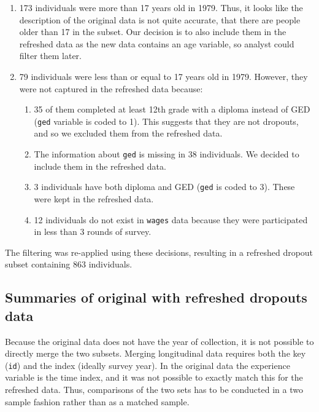 \documentclass{article}
\begin{document}
\begin{enumerate}
\def\labelenumi{\arabic{enumi}.}
\tightlist
\item
  173 individuals were more than 17 years old in 1979. Thus, it looks like the description of the original data is not quite accurate, that there are people older than 17 in the subset. Our decision is to also include them in the refreshed data as the new data contains an age variable, so analyst could filter them later.
\item
  79 individuals were less than or equal to 17 years old in 1979. However, they were not captured in the refreshed data because:

  \begin{enumerate}
  \def\labelenumii{\roman{enumii}.}
  \tightlist
  \item
    35 of them completed at least 12th grade with a diploma instead of GED (\texttt{ged} variable is coded to 1). This suggests that they are not dropouts, and so we excluded them from the refreshed data.
  \item
    The information about \texttt{ged} is missing in 38 individuals. We decided to include them in the refreshed data.
  \item
    3 individuals have both diploma and GED (\texttt{ged} is coded to 3). These were kept in the refreshed data.
  \item
    12 individuals do not exist in \texttt{wages} data because they were participated in less than 3 rounds of survey.
  \end{enumerate}
\end{enumerate}

The filtering was re-applied using these decisions, resulting in a refreshed dropout subset containing 863 individuals.

\hypertarget{summaries-of-original-with-refreshed-dropouts-data}{%
\subsection{Summaries of original with refreshed dropouts data}\label{summaries-of-original-with-refreshed-dropouts-data}}

Because the original data does not have the year of collection, it is not possible to directly merge the two subsets. Merging longitudinal data requires both the key (\texttt{id}) and the index (ideally survey year). In the original data the experience variable is the time index, and it was not possible to exactly match this for the refreshed data. Thus, comparisons of the two sets has to be conducted in a two sample fashion rather than as a matched sample.
\end{document}
